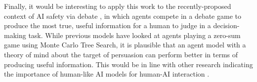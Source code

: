 \documentclass[10pt,letterpaper]{article}
\begin{document}
Finally, it would be interesting to apply this work to the recently-proposed context of AI safety via debate \cite{irving_ai_2018}, in which
agents compete in a debate game to produce the most true, useful information for a human to judge in a decision-making
task. While previous models have looked at agents playing a zero-sum game using Monte Carlo Tree Search, it is 
plausible that an agent model with a theory of mind about the target of persuasion can perform better in terms of producing
useful information. This would be in line with other research indicating the importance of human-like AI models for human-AI
interaction \cite{carroll2019utility, hilgard_learning_2019}.


%
%
%
%
\end{document}

